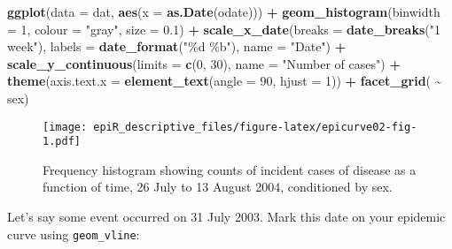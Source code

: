 \documentclass[
]{article}
\newenvironment{Shaded}{\begin{snugshade}}{\end{snugshade}}
\newcommand{\DataTypeTok}[1]{\textcolor[rgb]{0.13,0.29,0.53}{#1}}
\newcommand{\DecValTok}[1]{\textcolor[rgb]{0.00,0.00,0.81}{#1}}
\newcommand{\FloatTok}[1]{\textcolor[rgb]{0.00,0.00,0.81}{#1}}
\newcommand{\KeywordTok}[1]{\textcolor[rgb]{0.13,0.29,0.53}{\textbf{#1}}}
\newcommand{\NormalTok}[1]{#1}
\newcommand{\OperatorTok}[1]{\textcolor[rgb]{0.81,0.36,0.00}{\textbf{#1}}}
\newcommand{\StringTok}[1]{\textcolor[rgb]{0.31,0.60,0.02}{#1}}
\begin{document}
\begin{Shaded}
\begin{Highlighting}[]

\KeywordTok{ggplot}\NormalTok{(}\DataTypeTok{data =}\NormalTok{ dat, }\KeywordTok{aes}\NormalTok{(}\DataTypeTok{x =} \KeywordTok{as.Date}\NormalTok{(odate))) }\OperatorTok{+}
\StringTok{  }\KeywordTok{geom\_histogram}\NormalTok{(}\DataTypeTok{binwidth =} \DecValTok{1}\NormalTok{, }\DataTypeTok{colour =} \StringTok{"gray"}\NormalTok{, }\DataTypeTok{size =} \FloatTok{0.1}\NormalTok{) }\OperatorTok{+}
\StringTok{  }\KeywordTok{scale\_x\_date}\NormalTok{(}\DataTypeTok{breaks =} \KeywordTok{date\_breaks}\NormalTok{(}\StringTok{"1 week"}\NormalTok{), }\DataTypeTok{labels =} \KeywordTok{date\_format}\NormalTok{(}\StringTok{"\%d \%b"}\NormalTok{), }
     \DataTypeTok{name =} \StringTok{"Date"}\NormalTok{) }\OperatorTok{+}
\StringTok{  }\KeywordTok{scale\_y\_continuous}\NormalTok{(}\DataTypeTok{limits =} \KeywordTok{c}\NormalTok{(}\DecValTok{0}\NormalTok{, }\DecValTok{30}\NormalTok{), }\DataTypeTok{name =} \StringTok{"Number of cases"}\NormalTok{) }\OperatorTok{+}
\StringTok{  }\KeywordTok{theme}\NormalTok{(}\DataTypeTok{axis.text.x =} \KeywordTok{element\_text}\NormalTok{(}\DataTypeTok{angle =} \DecValTok{90}\NormalTok{, }\DataTypeTok{hjust =} \DecValTok{1}\NormalTok{)) }\OperatorTok{+}\StringTok{ }
\StringTok{  }\KeywordTok{facet\_grid}\NormalTok{( }\OperatorTok{\textasciitilde{}}\StringTok{ }\NormalTok{sex)}
\end{Highlighting}
\end{Shaded}

\begin{figure}
\centering
\texttt{[image: epiR\_descriptive\_files/figure-latex/epicurve02-fig-1.pdf]}
\caption{\label{fig:epicurve02}Frequency histogram showing counts of
incident cases of disease as a function of time, 26 July to 13 August
2004, conditioned by sex.}
\end{figure}

Let's say some event occurred on 31 July 2003. Mark this date on your
epidemic curve using \texttt{geom\_vline}:
\end{document}

